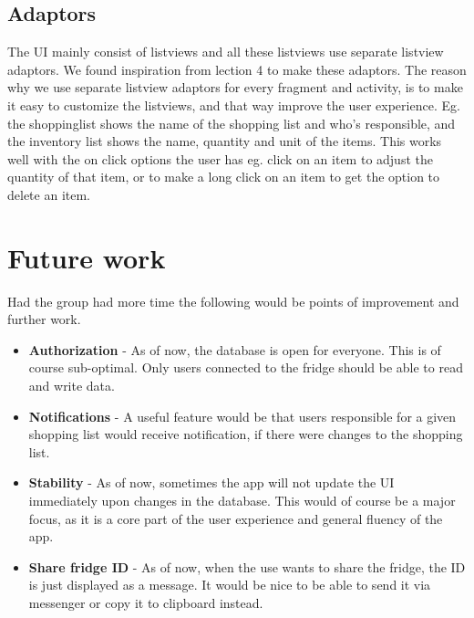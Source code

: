 \documentclass[12pt]{article}
\begin{document}
\subsection{Adaptors}
The UI mainly consist of listviews and all these listviews use separate listview adaptors. We found inspiration from lection 4 to make these adaptors. The reason why we use separate listview adaptors for every fragment and activity, is to make it easy to customize the listviews, and that way improve the user experience. Eg. the shoppinglist shows the name of the shopping list and who's responsible, and the inventory list shows the name, quantity and unit of the items. This works well with the on click options the user has eg. click on an item to adjust the quantity of that item, or to make a long click on an item to get the option to delete an item.

\section{Future work}
Had the group had more time the following would be points of improvement and further work.
\begin{itemize}
	\item \textbf{Authorization} - As of now, the database is open for everyone. This is of course sub-optimal. Only users connected to the fridge should be able to read and write data.
	\item \textbf{Notifications} - A useful feature would be that users responsible for a given shopping list would receive notification, if there were changes to the shopping list.
	\item \textbf{Stability} - As of now, sometimes the app will not update the UI immediately upon changes in the database. This would of course be a major focus, as it is a core part of the user experience and general fluency of the app.
	\item \textbf{Share fridge ID} - As of now, when the use wants to share the fridge, the ID is just displayed as a message. It would be nice to be able to send it via messenger or copy it to clipboard instead.
\end{itemize}
\end{document}
